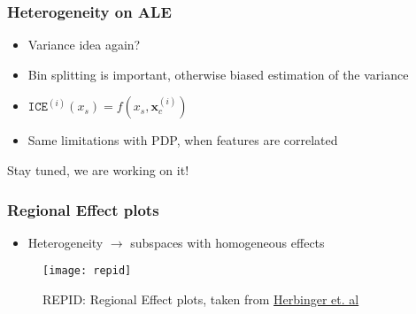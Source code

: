 \begin{frame}
  \frametitle{Heterogeneity on ALE}
  \begin{itemize}
    \item Variance idea again?
    \item Bin splitting is important, otherwise biased estimation of the variance
    \item $\mathtt{ICE}^{(i)}(x_s) = f(x_s, \mathbf{x}_c^{(i)})$
    \item Same limitations with PDP, when features are correlated
  \end{itemize}
  \noindent\makebox[\linewidth]{\rule{\paperwidth}{0.4pt}}
  Stay tuned, we are working on it!
\end{frame}


\begin{frame}
  \frametitle{Regional Effect plots}
  \begin{itemize}
    \item Heterogeneity $\rightarrow$ subspaces with homogeneous effects
  \end{itemize}

  \begin{figure}
    \centering
    \texttt{[image: repid]}
    \caption{REPID: Regional Effect plots, taken from \href{https://arxiv.org/abs/2202.07254}{Herbinger et. al}}
  \end{figure}
\end{frame}

